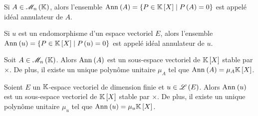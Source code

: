 \begin{defi}
Si \(A\in\M{n}\), alors l'ensemble \(\Ann{A}=\accol{P\in\poly\tq P\paren{A}=0}\) est appelé idéal annulateur de \(A\).

Si \(u\) est un endomorphisme d'un espace vectoriel \(E\), alors l'ensemble \(\Ann{u}=\accol{P\in\poly\tq P\paren{u}=0}\) est appelé idéal annulateur de \(u\).
\end{defi}

\begin{theo}
Soit \(A\in\M{n}\). Alors \(\Ann{A}\) est un sous-espace vectoriel de \(\poly\) stable par \(\times\). De plus, il existe un unique polynôme unitaire \(\mu_A\) tel que \(\Ann{A}=\mu_A\poly\).

Soient \(E\) un \(\mathbb{K}\)-espace vectoriel de dimension finie et \(u\in\mathscr{L}\left(E\right)\). Alors \(\Ann{u}\) est un sous-espace vectoriel de \(\poly\) stable par \(\times\). De plus, il existe un unique polynôme unitaire \(\mu_u\) tel que \(\Ann{u}=\mu_u\poly\).
\end{theo}

